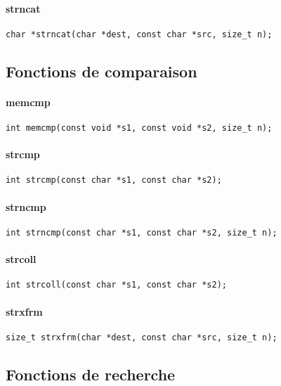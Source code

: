 \paragraph{strncat}
\begin{Verbatim}
char *strncat(char *dest, const char *src, size_t n);
\end{Verbatim}

\subsection{Fonctions de comparaison}

\paragraph{memcmp}
\begin{Verbatim}
int memcmp(const void *s1, const void *s2, size_t n);
\end{Verbatim}
\paragraph{strcmp}
\begin{Verbatim}
int strcmp(const char *s1, const char *s2);
\end{Verbatim}
\paragraph{strncmp}
\begin{Verbatim}
int strncmp(const char *s1, const char *s2, size_t n);
\end{Verbatim}
\paragraph{strcoll}
\begin{Verbatim}
int strcoll(const char *s1, const char *s2);
\end{Verbatim}
\paragraph{strxfrm}
\begin{Verbatim}
size_t strxfrm(char *dest, const char *src, size_t n);
\end{Verbatim}

\subsection{Fonctions de recherche}

